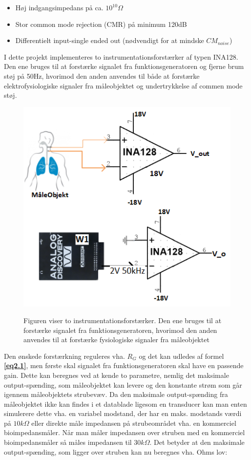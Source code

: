 \begin{itemize}
\item 	Høj indgangsimpedans på ca. $10^{10} \Omega $
\item	Stor common mode rejection (CMR) på minimum 120dB
\item 	Differentielt input-single ended out (nødvendigt for at mindske $CM_{noise}$)
\end{itemize}

I dette projekt implementeres to instrumentationsforstærker af typen INA128. Den ene bruges til at forstærke signalet fra funktionsgeneratoren og fjerne brum støj på 50Hz, hvorimod den anden anvendes til både at forstærke elektrofysiologiske signaler fra måleobjektet og undertrykkelse af commen mode støj.  

\begin{figure}[H]
\centering
{\includegraphics[width=\linewidth]
{Figure/InaOgMaleobjektOG}}
\caption{Figuren viser to instrumentationsforstærker. Den ene bruges til at forstærke signalet fra funktionsgeneratoren, hvorimod den anden anvendes til at forstærke fysiologiske signaler fra måleobjektet }
\label{ToINA128}
\end{figure}

Den ønskede forstærkning reguleres vha. $R_G$ og det kan udledes af formel \textbf{\ref{eq2.1}}, men første skal signalet fra funktionsgeneratoren skal have en passende gain. Dette kan beregnes ved at kende to parametre, nemlig det maksimale output-spænding, som måleobjektet kan levere og den konstante strøm som går igennem måleobjektets strubevæv. Da den maksimale output-spænding fra måleobjektet ikke kan findes i et datablade ligesom en transducer kan man enten simulerere dette vha. en variabel modstand, der har en maks. modstands værdi på $10k \Omega $ eller direkte måle impedansen på strubeområdet vha. en kommerciel bioimpedansmåler. Når man måler impedansen over struben med en kommerciel bioimpedansmåler så måles impedansen til $30k \Omega $. Det betyder at den maksimale output-spænding, som ligger over struben kan nu beregnes vha. Ohms lov: 


